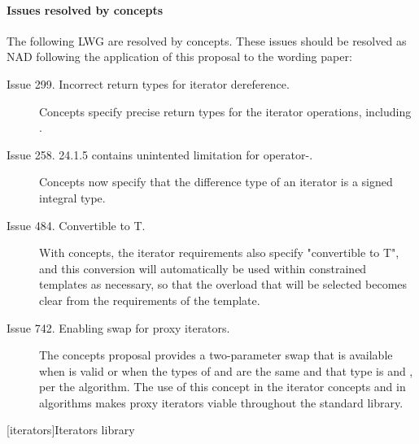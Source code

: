 \documentclass[american,twoside]{book}
\begin{document}
\paragraph*{Issues resolved by concepts}
The following LWG are resolved by concepts. These issues should be
resolved as NAD following the application of this proposal to the
wording paper:
\begin{description}
\item[Issue 299. Incorrect return types for iterator dereference.]
  Concepts specify precise return types for the iterator 
  operations, including .
\item[Issue 258. 24.1.5 contains unintented limitation for operator-.]
  Concepts now specify that the difference type of an iterator is a
  signed integral type.
\item[Issue 484. Convertible to T.]
With concepts, the iterator requirements also specify
"convertible to T", and this conversion will automatically be used
within constrained templates as necessary, so that the overload that
will be selected becomes clear from the requirements of the template.
\item[Issue 742. Enabling swap for proxy iterators.]  The concepts
  proposal provides a two-parameter swap that is available when
   is valid or when the types of  and
   are the same and that type is  and
  , per the  algorithm. The
  use of this  concept in the iterator concepts and in
  algorithms makes proxy iterators viable throughout the standard
  library.
\end{description}

\pagestyle{fancy}
\fancyhead[LE,RO]{\textbf{\rightmark}}
\fancyhead[RE]{\textbf{\leftmark\hspace{1em}\thepage}}
\fancyhead[LO]{\textbf{\thepage\hspace{1em}\leftmark}}


\renewcommand{\sectionmark}[1]{\markright{\thesection\hspace{1em}#1}}
\renewcommand{\chaptermark}[1]{\markboth{#1}{}}

\setcounter{chapter}{23}
[iterators]{Iterators library}
\end{document}
